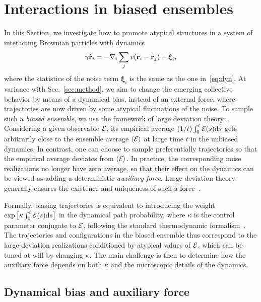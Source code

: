 \documentclass[superscriptaddress, twocolumn, prx, longbibliography, nofootinbib]{revtex4-1}
\begin{document}
\section{Interactions in biased ensembles}\label{sec:bias}

In this Section, we investigate how to promote atypical structures in a system of interacting Brownian particles with dynamics
\begin{equation}\label{eq:dyn_eq}
	\gamma\dot{\bf r}_i = - \nabla_i \sum_j v({\bf r}_i-{\bf r}_j) + {\boldsymbol\xi}_i ,
\end{equation}
where the statistics of the noise term ${\boldsymbol\xi}_i$ is the same as the one in~\eqref{eq:dyn}. At variance with Sec.~\ref{sec:method}, we aim to change the emerging collective behavior by means of a dynamical bias, instead of an external force, where trajectories are now driven by some atypical fluctuations of the noise. To sample such a {\it biased ensemble}, we use the framework of large deviation theory~\cite{Chetrite2013, Jack2010}. Considering a given observable $\cal E$, its empirical average $(1/t)\int_{0}^{t} {\cal E}(s){\rm d}s$ gets arbitrarily close to the ensemble average $\langle{\cal E}\rangle$ at large time $t$ in the unbiased dynamics. In contrast, one can choose to sample preferentially trajectories so that the empirical average deviates from $\langle{\cal E}\rangle$. In practice, the corresponding noise realizations no longer have zero average, so that their effect on the dynamics can be viewed as adding a deterministic {\it auxiliary force}. Large deviation theory generally ensures the existence and uniqueness of such a force~\cite{Jack2010,Chetrite2013}.


Formally, biasing trajectories is equivalent to introducing the weight $\exp\big[\kappa\int_0^t{\cal E}(s){\rm d}s\big]$ in the dynamical path probability, where $\kappa$ is the control parameter conjugate to $\cal E$, following the standard thermodynamic formalism~\cite{Touchette2009}. The trajectories and configurations in the biased ensemble thus correspond to the large-deviation realizations conditioned by atypical values of $\cal E$, which can be tuned at will by changing $\kappa$. The main challenge is then to determine how the auxiliary force depends on both $\kappa$ and the microscopic details of the dynamics.




\subsection{Dynamical bias and auxiliary force}\label{sec:biasexternal}
\end{document}
